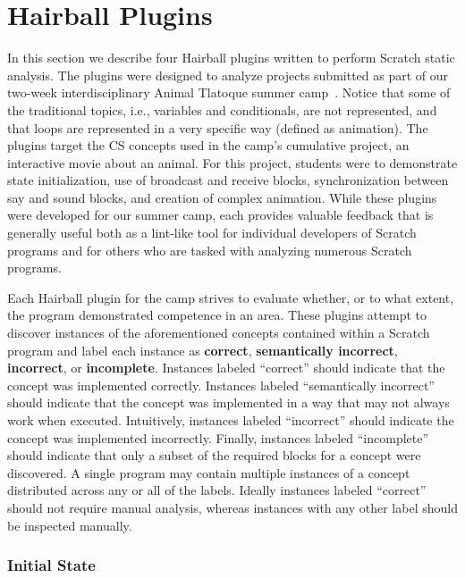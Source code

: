 \section{Hairball Plugins} 
In this section we describe four Hairball plugins written to perform Scratch
static analysis.  The plugins were designed to analyze projects submitted as
part of our two-week interdisciplinary Animal Tlatoque summer
camp~\cite{Franklin:2013:SBO}.  Notice that some of the traditional topics,
i.e., variables and conditionals, are not represented, and that loops are
represented in a very specific way (defined as animation). The plugins target
the CS concepts used in the camp's cumulative project, an interactive movie
about an animal. For this project, students were to demonstrate state
initialization, use of broadcast and receive blocks, synchronization between
say and sound blocks, and creation of complex animation. While these plugins
were developed for our summer camp, each provides valuable feedback that is
generally useful both as a lint-like tool for individual developers of Scratch
programs and for others who are tasked with analyzing numerous Scratch
programs.

Each Hairball plugin for the camp strives to evaluate whether, or to what
extent, the program demonstrated competence in an area. These plugins attempt
to discover instances of the aforementioned concepts contained within a Scratch
program and label each instance as {\bf correct}, {\bf semantically incorrect},
{\bf incorrect}, or {\bf incomplete}. Instances labeled ``correct'' should
indicate that the concept was implemented correctly. Instances labeled
``semantically incorrect'' should indicate that the concept was implemented in
a way that may not always work when executed. Intuitively, instances labeled
``incorrect'' should indicate the concept was implemented incorrectly. Finally,
instances labeled ``incomplete'' should indicate that only a subset of the
required blocks for a concept were discovered. A single program may contain
multiple instances of a concept distributed across any or all of the
labels. Ideally instances labeled ``correct'' should not require manual
analysis, whereas instances with any other label should be inspected manually.


\subsubsection*{Initial State}

